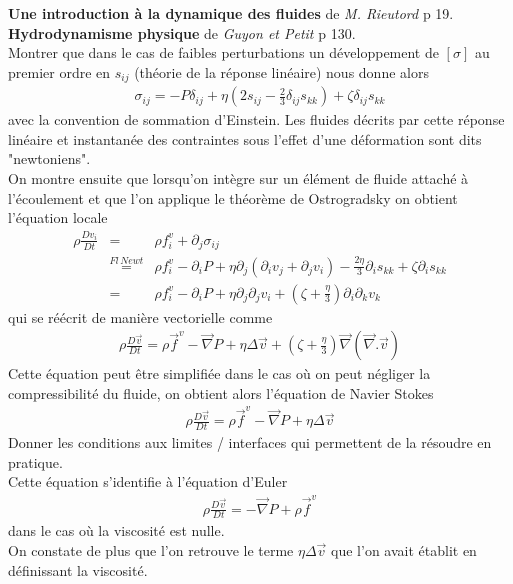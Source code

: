 \documentclass[12pt,prb,aps,epsf]{article}
\begin{document}
\textbf{Une introduction à la dynamique des fluides} de \textit{M. Rieutord} p 19.\\
\textbf{Hydrodynamisme physique} de \textit{Guyon et Petit} p 130.\\ 
Montrer que dans le cas de faibles perturbations un développement de $[\sigma]$ au premier ordre en $s_{ij}$ (théorie de la réponse linéaire) nous donne alors 
\begin{eqnarray}
\sigma_{ij} = -P\delta_{ij} + \eta\left(2s_{ij} - \frac{2}{3}\delta_{ij}s_{kk}\right) + \zeta \delta_{ij} s_{kk}
\end{eqnarray} 
avec la convention de sommation d'Einstein. Les fluides décrits par cette réponse linéaire et instantanée des contraintes sous l'effet d'une déformation sont dits "newtoniens".\\ 
On montre ensuite que lorsqu'on intègre sur un élément de fluide attaché à l'écoulement et que l'on applique le théorème de Ostrogradsky on obtient l'équation locale 
\begin{eqnarray}
\rho \frac{D v_i}{D t} &=& \rho f_i^v + \partial_j\sigma_{ij}\\
&\stackrel{Fl\,Newt}=& \rho f_i^v -\partial_i P + \eta \partial_j\left(\partial_iv_j + \partial_jv_i\right) - \frac{2\eta}{3}\partial_i s_{kk} + \zeta \partial_i s_{kk}\\
&=& \rho f_i^v -\partial_i P + \eta \partial_j \partial_jv_i + \left(\zeta+ \frac{\eta}{3}\right) \partial_i \partial_kv_k
\end{eqnarray}
qui se réécrit de manière vectorielle comme
\begin{eqnarray}
\rho \frac{D\vec{v}}{D t} = \rho \vec{f}^v - \vec{\nabla}P + \eta \Delta \vec{v}  + \left(\zeta+ \frac{\eta}{3}\right) \vec{\nabla} (\vec{\nabla}.\vec{v})
\end{eqnarray}
Cette équation peut être simplifiée dans le cas où on peut négliger la compressibilité du fluide, on obtient alors l'équation de Navier Stokes 
\begin{eqnarray}
\rho \frac{D\vec{v}}{D t} = \rho \vec{f}^v - \vec{\nabla}P + \eta \Delta \vec{v}
\end{eqnarray}
Donner les conditions aux limites / interfaces qui permettent de la résoudre en pratique.\\
Cette équation s'identifie à l'équation d'Euler  
\begin{eqnarray}
\rho \frac{D\vec{v}}{Dt} = -\vec{\nabla} P + \rho\vec{f}^v
\end{eqnarray}
dans le cas où la viscosité est nulle.\\
On constate de plus que l'on retrouve le terme $\eta \Delta \vec{v}$ que l'on avait établit en définissant la viscosité.
\end{document}
